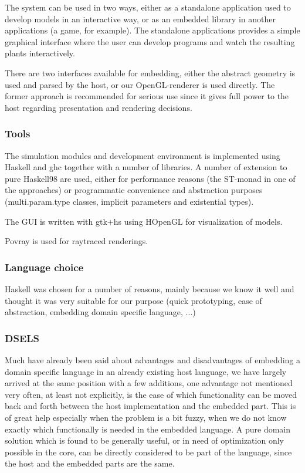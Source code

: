     The system can be used in two ways, either as a standalone
    application used to develop models in an interactive way, or as an
    embedded library in another applications (a game, for example).
    The standalone applications provides a simple graphical interface
    where the user can develop programs and watch the resulting plants
    interactively. 

    There are two interfaces available for embedding, either the
    abstract geometry is used and parsed by the host, or our
    OpenGL-renderer is used directly. The former approach is
    recommended for serious use since it gives full power to the host
    regarding presentation and rendering decisions.


\subsubsection{Tools}
 
    The simulation modules and development environment is implemented
    using Haskell and ghc together with a number of libraries. A
    number of extension to pure Haskell98 are used, either for
    performance reasons (the ST-monad in one of the approaches) or
    programmatic convenience and abstraction purposes
    (multi.param.type classes, implicit parameters and existential
    types).

    The GUI is written with gtk+hs using HOpenGL for visualization of models. 

    Povray\cite{povray} is used for raytraced renderings.

\subsubsection{Language choice}

    Haskell was chosen for a number of reasons, mainly because we
    know it well and thought it was very suitable for our purpose
    (quick prototyping, ease of abstraction, embedding domain specific
    language, ...)


\subsubsection{DSELS}

    Much have already been said about advantages and disadvantages
    of embedding a domain specific language in an already existing host
    language, we have largely arrived at the same position
    with a few additions, one advantage not mentioned very often, at least
    not explicitly, is the ease of which functionality can be moved back
    and forth between the host implementation and the embedded part.
    This is of great help especially when the problem is a bit fuzzy, when
    we do not know exactly which functionally is needed in the embedded
    language. A pure domain solution which is found to be generally
    useful, or in need of optimization only possible in the core, can be
    directly considered to be part of the language, since the host and
    the embedded parts are the same.




